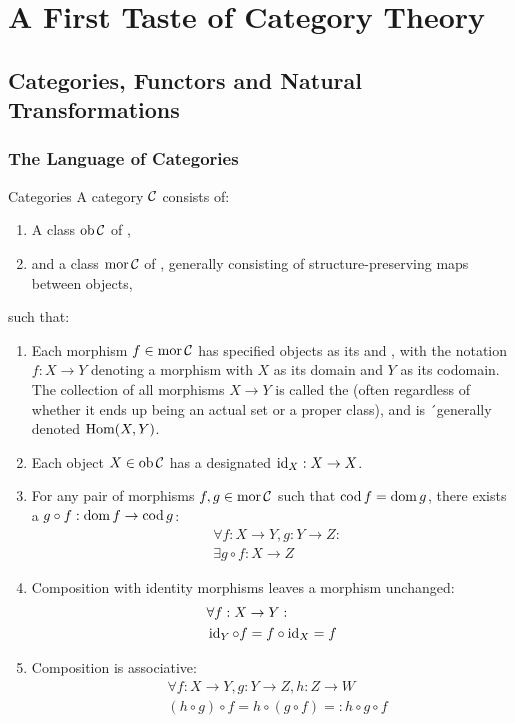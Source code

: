 \part{A First Taste of Category Theory}
\parttoc
\chapter{Categories, Functors and Natural Transformations}
\section{The Language of Categories}
\begin{importantdefinition}{Categories}{}
	A category $\mathcal{C}$ consists of:
	\begin{enumerate}
		\item A class $\operatorname{ob} \mathcal{C}$ of ,
		\item and a class $\operatorname{mor} \mathcal{C}$ of , generally consisting of structure-preserving maps between objects,
	\end{enumerate}
	such that:
	\begin{enumerate}
		\item Each morphism $f \in \operatorname{mor} \mathcal{C}$ has specified objects as its  and , with the notation $f : X \to Y$ denoting a morphism with $X$ as its domain and $Y$ as its codomain. The collection of all morphisms $X \to Y$ is called the  (often regardless of whether it ends up being an actual set or a proper class), and is ´generally denoted $\textnormal{Hom}(X,Y)$.
		\item Each object $X \in \operatorname{ob} \mathcal{C}$ has a designated  $\operatorname{id}_X : X \to X$.
		\item For any pair of morphisms $f,g \in \operatorname{mor} \mathcal{C}$ such that $\operatorname{cod} f = \operatorname{dom} g$, there exists a  $g \circ f : \operatorname{dom} f \to \operatorname{cod} g$:
		\begin{align*}
			&\forall f : X \to Y, g : Y \to Z :\\ &\exists g \circ f : X \to Z
		\end{align*}
		\item Composition with identity morphisms leaves a morphism unchanged:
		\begin{align*}
			&\forall f : X \to Y:\\ 
			&\operatorname{id}_Y \circ f = f \circ \operatorname{id}_X = f
		\end{align*}
		\item Composition is associative:
		\begin{align*}
			&\forall f : X \to Y, g : Y \to Z, h : Z \to W\\ 
			&(h \circ g) \circ f = h \circ (g \circ f) =: h \circ g \circ f
		\end{align*}
	\end{enumerate}
\end{importantdefinition}
